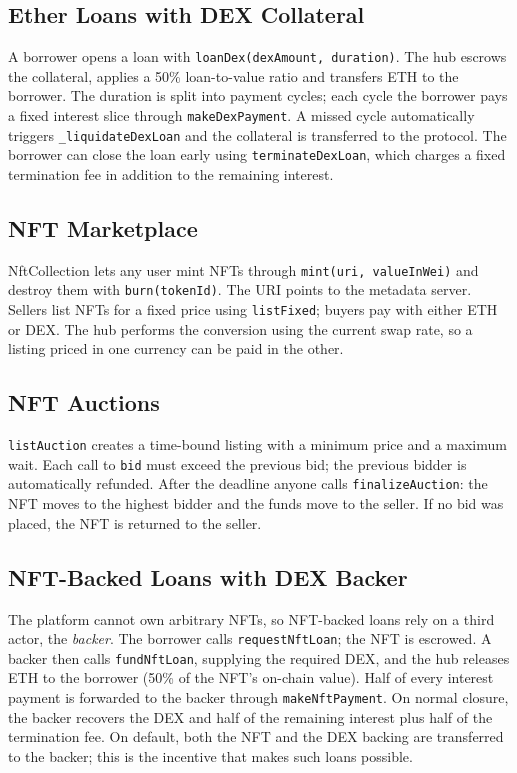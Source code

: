 \documentclass[12pt,a4paper]{article}
\begin{document}
\subsection{Ether Loans with DEX Collateral}
A borrower opens a loan with \texttt{loanDex(dexAmount, duration)}. The hub escrows the collateral, applies a 50\% loan-to-value ratio and transfers ETH to the borrower. The duration is split into payment cycles; each cycle the borrower pays a fixed interest slice through \texttt{makeDexPayment}. A missed cycle automatically triggers \texttt{\_liquidateDexLoan} and the collateral is transferred to the protocol. The borrower can close the loan early using \texttt{terminateDexLoan}, which charges a fixed termination fee in addition to the remaining interest.

\subsection{NFT Marketplace}
NftCollection lets any user mint NFTs through \texttt{mint(uri, valueInWei)} and destroy them with \texttt{burn(tokenId)}. The URI points to the metadata server. Sellers list NFTs for a fixed price using \texttt{listFixed}; buyers pay with either ETH or DEX. The hub performs the conversion using the current swap rate, so a listing priced in one currency can be paid in the other.

\subsection{NFT Auctions}
\texttt{listAuction} creates a time-bound listing with a minimum price and a maximum wait. Each call to \texttt{bid} must exceed the previous bid; the previous bidder is automatically refunded. After the deadline anyone calls \texttt{finalizeAuction}: the NFT moves to the highest bidder and the funds move to the seller. If no bid was placed, the NFT is returned to the seller.

\subsection{NFT-Backed Loans with DEX Backer}
The platform cannot own arbitrary NFTs, so NFT-backed loans rely on a third actor, the \emph{backer}. The borrower calls \texttt{requestNftLoan}; the NFT is escrowed. A backer then calls \texttt{fundNftLoan}, supplying the required DEX, and the hub releases ETH to the borrower (50\% of the NFT's on-chain value). Half of every interest payment is forwarded to the backer through \texttt{makeNftPayment}. On normal closure, the backer recovers the DEX and half of the remaining interest plus half of the termination fee. On default, both the NFT and the DEX backing are transferred to the backer; this is the incentive that makes such loans possible.
\end{document}
